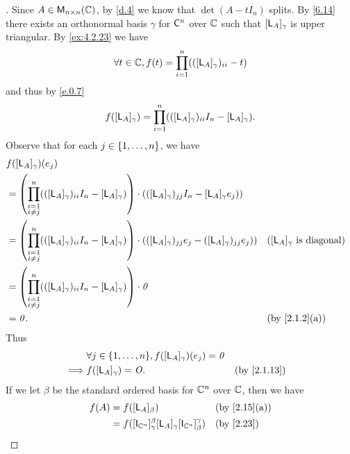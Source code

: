 \begin{proof}[]
	Since \(A \in \ms[n][n][\C]\), by \cref{d.4} we know that \(\det(A - t I_n)\) splits.
	By \cref{6.14} there exists an orthonormal basis \(\gamma\) for \(\mathsf{C}^n\) over \(\mathbb{C}\) such that \([\mathsf{L}_A]_{\gamma}\) is upper triangular.
	By \cref{ex:4.2.23} we have
	\[
		\forall t \in \mathbb{C}, f(t) = \prod_{i = 1}^n (([\mathsf{L}_A]_{\gamma})_{i i} - t)
	\]
	and thus by \cref{e.0.7}
	\[
		f([\mathsf{L}_A]_{\gamma}) = \prod_{i = 1}^n (([\mathsf{L}_A]_{\gamma})_{i i} I_n - [\mathsf{L}_A]_{\gamma}).
	\]
	Observe that for each \(j \in \left\lbrace1, \dots, n\right\rbrace\), we have
	\begin{align*}
		 & f([\L_A]_{\gamma})(e_j)                         \\
		 & = \pa{\prod_{\substack{i = 1                    \\ i \neq j}}^n (([\L_A]_{\gamma})_{i i} I_n - [\L_A]_{\gamma})} \cdot (([\L_A]_{\gamma})_{j j} I_n - [\L_A]_{\gamma} e_j))         \\
		 & = \pa{\prod_{\substack{i = 1                    \\ i \neq j}}^n (([\L_A]_{\gamma})_{i i} I_n - [\L_A]_{\gamma})} \cdot (([\L_A]_{\gamma})_{j j} e_j - ([\L_A]_{\gamma})_{j j} e_j)) && \text{(\([\L_A]_{\gamma}\) is diagonal)} \\
		 & = \pa{\prod_{\substack{i = 1                    \\ i \neq j}}^n (([\L_A]_{\gamma})_{i i} I_n - [\L_A]_{\gamma})} \cdot \zv \\
		 & = \zv.                       &  & \by{2.1.2}[a]
	\end{align*}
	Thus
	\begin{align*}
		         & \forall j \in \set{1, \dots, n}, f([\L_A]_{\gamma})(e_j) = \zv                  \\
		\implies & f([\L_A]_{\gamma}) = \zm.                                      &  & \by{2.1.13}
	\end{align*}
	If we let \(\beta\) be the standard ordered basis for \(\mathbb{C}^n\) over \(\mathbb{C}\), then we have
	\begin{align*}
		f(A) & = f([\L_A]_{\beta})                                                                                                                                                               &  & \by{2.15}[a]                  \\
		     & = f([\IT[\C^n]]_{\gamma}^{\beta} [\L_A]_{\gamma} [\IT[\C^n]]_{\beta}^{\gamma})                                                                                                    &  & \by{2.23}                     \\

\end{align*}
\end{proof}
